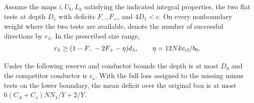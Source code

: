 \begin{proposition}\label{prop:bounded-weight-test-transfer}
Assume the maps \(i,U_b,L_a\) satisfying the indicated integral
properties, the two flat tests at depth \(D_1\) with deficits
\(F_-,F_+\), and \(4D_1<c\). On every nonboundary weight
where the two tests are available, denote the number of successful directions by \(r_\lambda\). In the prescribed size range,
\[
 r_\lambda\ge(1-F_--2F_+-\eta)d_\lambda,\qquad \eta=12Nkc_{\rm cl}/b_0.
\]

Under the following reserve and conductor bounds the depth is
at most \(D_p\) and the competitor conductor is \(c_\star\).
With the full loss assigned to the missing minus tests on the
lower boundary, the mean deficit over the original box is at most
\(6(C_A+C_s)NN_1/Y+2/Y\).
\end{proposition}

